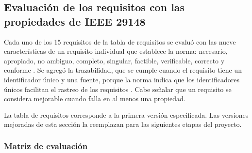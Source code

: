 \subsection{Evaluación de los requisitos con las propiedades de IEEE 29148}
Cada uno de los 15 requisitos de la tabla de requisitos se evaluó con las nueve características de un requisito individual que establece la norma: necesario, apropiado, no ambiguo, completo, singular, factible, verificable, correcto y conforme \cite[\nopp cl.~5.2.5]{ieee29148}. Se agregó la trazabilidad, que se cumple cuando el requisito tiene un identificador único y una fuente, porque la norma indica que los identificadores únicos facilitan el rastreo de los requisitos \cite[\nopp cl.~5.2.8.2]{ieee29148}. Cabe señalar que un requisito se considera mejorable cuando falla en al menos una propiedad.

La tabla de requisitos corresponde a la primera versión especificada. Las versiones mejoradas de esta sección la reemplazan para las siguientes etapas del proyecto.

\subsubsection{Matriz de evaluación}\mbox{}

